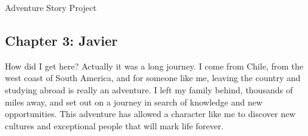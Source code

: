 \documentclass{article}
\begin{document}
\Huge Adventure Story Project

\subsection*{Chapter 3: Javier}

\normalsize How did I get here? Actually it was a long journey. I come from Chile, from the west coast of South America, and for someone like me, leaving the country and studying abroad is really an adventure. I left my family behind, thousands of miles away, and set out on a journey in search of knowledge and new opportunities. This adventure has allowed a character like me to discover new cultures and exceptional people that will mark life forever.
\end{document}
